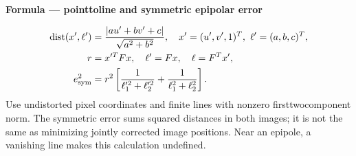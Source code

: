 \documentclass[letterpaper,11pt,english,openany,oneside]{jupyterBook}
\begin{document}
\begin{TextbookBox}
\textbf{Formula — point\sphinxhyphen{}to\sphinxhyphen{}line and symmetric epipolar error}\par\smallskip
\begin{equation}\label{equation:lectures/lecture04/estimation:eq-lec04-epipolar-error}
\begin{split}\begin{aligned}
\operatorname{dist}(x',\ell')&=\frac{|au'+bv'+c|}{\sqrt{a^2+b^2}},\quad
x'=(u',v',1)^T,\ \ell'=(a,b,c)^T,\\
r&=x'^TFx,\quad \ell'=Fx,\quad \ell=F^Tx',\\
e_{\rm sym}^2&=r^2\left[\frac1{\ell_1'^2+\ell_2'^2}
+\frac1{\ell_1^2+\ell_2^2}\right].
\end{aligned}\end{split}
\end{equation}
\sphinxAtStartPar
Use undistorted pixel coordinates and finite lines with nonzero first\sphinxhyphen{}two\sphinxhyphen{}component norm. The symmetric error sums squared distances in both images; it is not the same as minimizing jointly corrected image positions. Near an epipole, a vanishing line makes this calculation undefined.

\end{TextbookBox}
\end{document}
